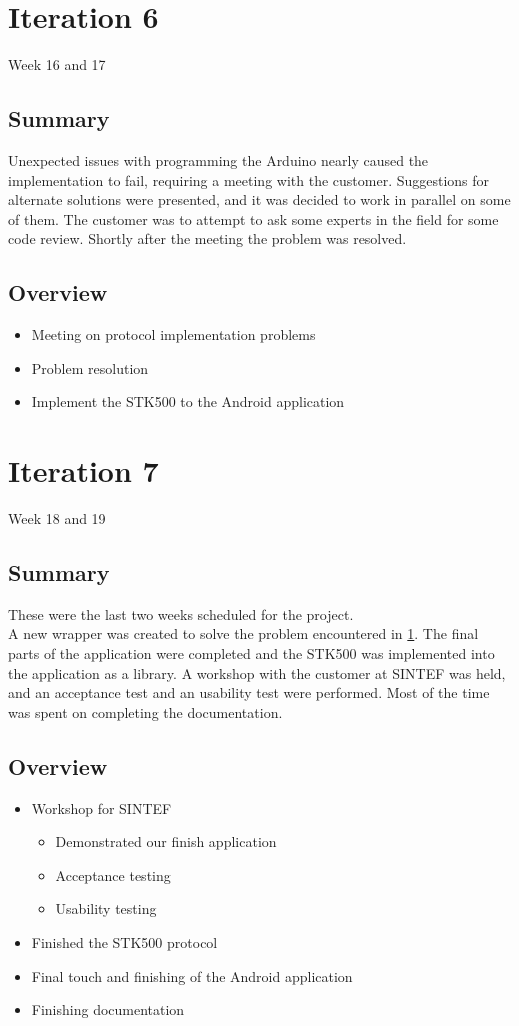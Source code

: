 \section{Iteration 6}\label{iteration6}
Week 16 and 17

\subsection{Summary}
	Unexpected issues with programming the Arduino nearly caused the implementation to fail, requiring a meeting with the customer.
Suggestions for alternate solutions were presented, and it was decided to work in parallel on some of them. The customer was to attempt to ask some experts in the field for some code review.
Shortly after the meeting the problem was resolved.

\subsection{Overview}
\begin{itemize}
    \item{Meeting on protocol implementation problems}
    \item{Problem resolution}
	\item{Implement the STK500 to the Android application}
\end{itemize}

\section{Iteration 7}
Week 18 and 19

\subsection{Summary}
These were the last two weeks scheduled for the project.\\
A new wrapper was created to solve the problem encountered in \ref{iteration6}.
The final parts of the application were completed and the STK500 was implemented into the application as a library.
	A workshop with the customer at SINTEF was held, and an acceptance test and an usability test were performed. Most of the time was spent on completing the documentation.

\subsection{Overview}
\begin{itemize}
	\item{Workshop for SINTEF}
		\begin{itemize}
			\item{Demonstrated our finish application}
			\item{Acceptance testing}
			\item{Usability testing}
		\end{itemize}
	\item{Finished the STK500 protocol}
	\item{Final touch and finishing of the Android application}
	\item{Finishing documentation}
\end{itemize}
